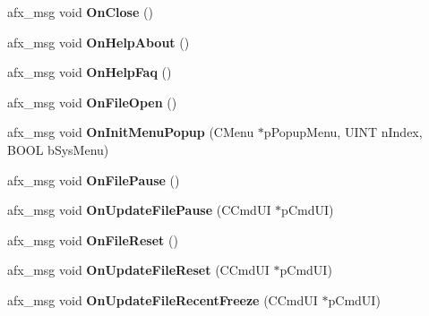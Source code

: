 \begin{DoxyCompactItemize}
\item 
\mbox{\label{class_main_wnd_a81c7de136db9ecc6e98033ae3c3d511c}} 
afx\+\_\+msg void {\bfseries On\+Close} ()
\item 
\mbox{\label{class_main_wnd_a2151b9822f8f20900f98142b3f74d2be}} 
afx\+\_\+msg void {\bfseries On\+Help\+About} ()
\item 
\mbox{\label{class_main_wnd_ad808c9977aa3296be28ded7caad4fe73}} 
afx\+\_\+msg void {\bfseries On\+Help\+Faq} ()
\item 
\mbox{\label{class_main_wnd_ad60908c1c8c44204ea3c87c1109fa468}} 
afx\+\_\+msg void {\bfseries On\+File\+Open} ()
\item 
\mbox{\label{class_main_wnd_ad6e6b4e816151f616328de005d5f5a3d}} 
afx\+\_\+msg void {\bfseries On\+Init\+Menu\+Popup} (C\+Menu $\ast$p\+Popup\+Menu, U\+I\+NT n\+Index, B\+O\+OL b\+Sys\+Menu)
\item 
\mbox{\label{class_main_wnd_a31048c989663d5e2121c2e96b6c8408d}} 
afx\+\_\+msg void {\bfseries On\+File\+Pause} ()
\item 
\mbox{\label{class_main_wnd_a408711da9dc428b4bf0d7335089a4482}} 
afx\+\_\+msg void {\bfseries On\+Update\+File\+Pause} (C\+Cmd\+UI $\ast$p\+Cmd\+UI)
\item 
\mbox{\label{class_main_wnd_ac61e74030dfc91e1439e7b4c6c4ee59c}} 
afx\+\_\+msg void {\bfseries On\+File\+Reset} ()
\item 
\mbox{\label{class_main_wnd_a14c19b1298d7910f712c2aa347e7fe19}} 
afx\+\_\+msg void {\bfseries On\+Update\+File\+Reset} (C\+Cmd\+UI $\ast$p\+Cmd\+UI)
\item 
\mbox{\label{class_main_wnd_a105c377d7748cfb083db564e0f545383}} 
afx\+\_\+msg void {\bfseries On\+Update\+File\+Recent\+Freeze} (C\+Cmd\+UI $\ast$p\+Cmd\+UI)
\item 
\mbox{\label{class_main_wnd_ae80656d038d25f9d3ad2dc7b0d283a54}} 

\end{DoxyCompactItemize}
